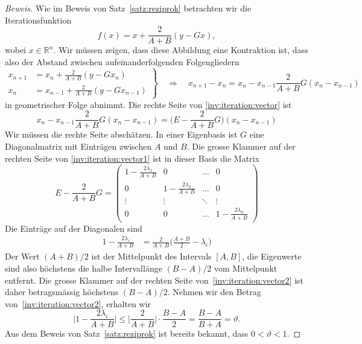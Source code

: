 \begin{proof}[Beweis]
Wie im Beweis von Satz~\ref{satz:reziprok} betrachten wir die
Iterationsfunktion
\[
f(x) = x + \frac{2}{A+B}(y-Gx),
\]
wobei $x\in\mathbb R^n$.
Wir müssen zeigen, dass diese Abbildung eine Kontraktion ist, dass
also der Abstand zwischen aufeinanderfolgenden Folgengliedern 
\begin{equation}
\left.
\begin{aligned}
x_{n+1} &= x_n + \frac{2}{A+B}(y-Gx_n)
\\
x_n &= x_{n-1} + \frac{2}{A+B}(y-Gx_{n-1})
\end{aligned}
\right\}
\quad
\Rightarrow
\quad
x_{n+1}- x_{n}
=
x_n-x_{n-1} \frac{2}{A+B}G(x_n-x_{n-1})
\label{inv:iteration:vector}
\end{equation}
in geometrischer Folge abnimmt.
Die rechte Seite von \eqref{inv:iteration:vector}
ist
\begin{equation}
x_n-x_{n-1} \frac{2}{A+B}G(x_n-x_{n-1})
=
\biggl(E-\frac{2}{A+B}G\biggr) (x_n-x_{n-1})
\label{inv:iteration:vector1}
\end{equation}
Wir müssen die rechte Seite abschätzen.
In einer Eigenbasis ist $G$ eine Diagonalmatrix mit Einträgen zwischen
$A$ und $B$.
Die grosse Klammer auf der rechten Seite von \eqref{inv:iteration:vector1}
ist in dieser Basis die Matrix
\[
E-\frac{2}{A+B}G
=
\begin{pmatrix}
1-\frac{2\lambda_1}{A+B} &            0             &\dots &        0         \\
          0              & 1-\frac{2\lambda_2}{A+B} &\dots &        0         \\
      \vdots             &          \vdots          &\ddots&     \vdots       \\
          0              &            0             &\dots & 1-\frac{2\lambda_n}{A+B}
\end{pmatrix}
\]
Die Einträge auf der Diagonalen sind
\begin{align}
1-
\frac{2 \lambda_i }{A+B}
&=
\frac{2}{A+B}
\biggl(
\frac{A+B}2 - \lambda_i
\biggr)
\label{inv:iteration:vector2}
\end{align}
Der Wert $(A+B)/2$ ist der Mittelpunkt des Intervals $[A,B]$, die Eigenwerte
sind also höchstens die halbe Intervallänge $(B-A)/2$ vom Mittelpunkt
entfernt.
Die grosse Klammer auf der rechten Seite von~\eqref{inv:iteration:vector2}
ist daher betragsmässig höchstens $(B-A)/2$.
Nehmen wir den Betrag von~\eqref{inv:iteration:vector2}, erhalten wir
\[
\biggl|
1-
\frac{2 \lambda_i }{A+B}
\biggr|
\le 
\biggl|
\frac2{A+B}
\biggr|
\cdot \frac{B-A}2
=
\frac{B-A}{B+A}=\vartheta.
\]
Aus dem Beweis von Satz~\ref{satz:reziprok} ist bereits bekannt, dass
$0<\vartheta < 1$.


\end{proof}
